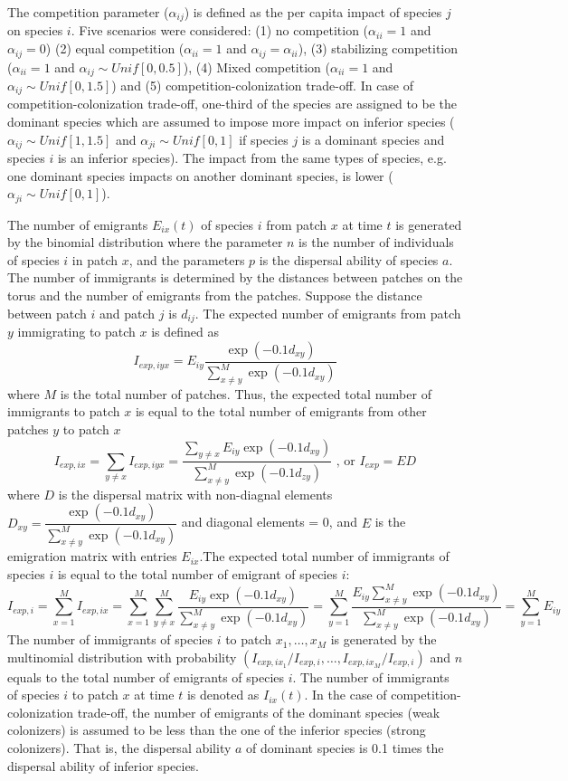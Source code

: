 	The competition parameter ($\alpha_{ij}$) is defined as the per capita impact of species $j$ on species $i$. Five scenarios were considered: (1) no competition ($\alpha_{ii}=1$ and $\alpha_{ij}=0$) (2) equal competition ($\alpha_{ii}=1$ and $\alpha_{ij}=\alpha_{ii}$), (3) stabilizing competition ($\alpha_{ii}=1$ and $\alpha_{ij}\sim Unif[0,0.5]$), (4) Mixed competition ($\alpha_{ii}=1$ and $\alpha_{ij}\sim Unif[0,1.5]$) and (5) competition-colonization trade-off. In case of competition-colonization trade-off, one-third of the species are assigned to be the dominant species which are assumed to impose more impact on inferior species ($\alpha_{ij}\sim Unif[1,1.5]$ and $\alpha_{ji}\sim Unif[0,1]$ if species $j$ is a dominant species and species $i$ is an inferior species). The impact from the same types of species, e.g. one dominant species impacts on another dominant species, is lower ($\alpha_{ji}\sim Unif[0,1]$). 
	
	The number of emigrants $E_{ix}(t)$ of species $i$ from patch $x$ at time $t$ is generated by the binomial distribution where the parameter $n$ is the number of individuals of species $i$ in patch $x$, and the parameters $p$ is the dispersal ability of species $a$. The number of immigrants is determined by the distances between patches on the torus and the number of emigrants from the patches. Suppose the distance between patch $i$ and patch $j$ is $d_{ij}$. The expected number of emigrants from patch $y$ immigrating to patch $x$ is defined as 
	\[
	I_{exp,iyx} = E_{iy}\dfrac{\exp(-0.1d_{xy})}{\sum_{x \neq y}^M \exp(-0.1d_{xy})}
	\]
	where $M$ is the total number of patches. Thus, the expected total number of immigrants to patch $x$ is equal to the total number of emigrants from other patches $y$ to patch $x$ 
	\[
	I_{exp,ix} = \sum_{y \neq x} I_{exp,iyx} =  \dfrac{\sum_{y \neq x} E_{iy}\exp(-0.1d_{xy})}{\sum_{x \neq y}^M \exp(-0.1d_{zy})}
	\text{ , or }
	I_{exp} = ED
	\]
	where $D$ is the dispersal matrix with non-diagnal elements $D_{xy} = \dfrac{\exp(-0.1d_{xy})}{\sum_{x \neq y}^{M} \exp(-0.1d_{xy})}$ and diagonal elements = 0, and $E$ is the emigration matrix with entries $E_{ix}$.The expected total number of immigrants of species $i$ is equal to the total number of emigrant of species $i$: 
	\[
	I_{exp,i} = 
	\sum_{x = 1}^M I_{exp,ix} = 
	\sum_{x = 1}^M \sum_{y \neq x}^M \frac{E_{iy}\exp(-0.1d_{xy})}{\sum_{x \neq y}^{M} \exp(-0.1d_{xy})} = 
	\sum_{y = 1}^M \frac{E_{iy} \sum_{x \neq y}^M \exp(-0.1d_{xy})}{\sum_{x \neq y}^{M} \exp(-0.1d_{xy})} =
	\sum_{y = 1}^M E_{iy}
	\]
	The number of immigrants of species $i$ to patch $x_1,\dots,x_M$ is generated by the multinomial distribution with probability $(I_{exp,ix_1}/I_{exp,i},\dots,I_{exp,ix_M}/I_{exp,i})$ and $n$ equals to the total number of emigrants of species $i$. The number of immigrants of species $i$ to patch $x$ at time $t$ is denoted as $I_{ix}(t)$. In the case of competition-colonization trade-off, the number of emigrants of the dominant species (weak colonizers) is assumed to be less than the one of the inferior species (strong colonizers). That is, the dispersal ability $a$ of dominant species is 0.1 times the dispersal ability of inferior species.
	
